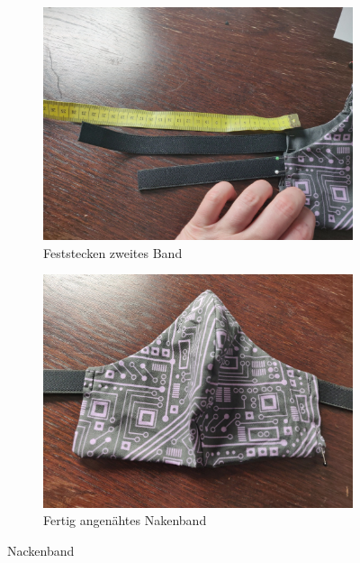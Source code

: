 \documentclass[12pt,parskip=full]{scrartcl}
\begin{document}
\begin{figure}[ht]
    \begin{subfigure}{0.48\textwidth}
        \centering
        \includegraphics[width = \linewidth]{Pictures/10_Straps/Straps3_resized.jpg}
        \caption{Feststecken zweites Band}
        \label{Strap3}
    \end{subfigure}
    \begin{subfigure}{0.48\textwidth}
        \centering
        \includegraphics[width = \linewidth]{Pictures/10_Straps/Straps4_resized.jpg}
        \caption{Fertig angenähtes Nakenband}
        \label{Strap4}
    \end{subfigure}
    \caption{Nackenband}
    \label{Strap}
\end{figure}
\end{document}

